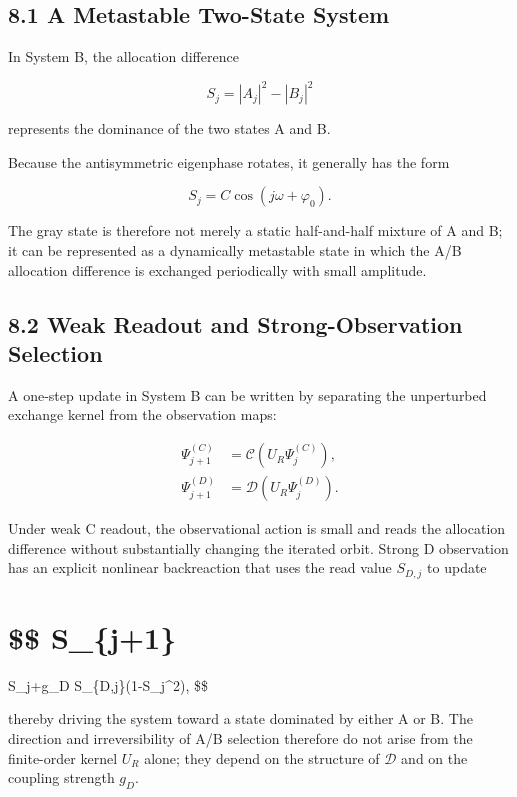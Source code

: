 \documentclass[
  a4paper,
  10pt]{article}
\begin{document}
\subsection{8.1 A Metastable Two-State
System}\label{81-a-metastable-two-state-system}

In System B, the allocation difference

\[
S_j=|A_j|^2-|B_j|^2
\]

represents the dominance of the two states A and B.

Because the antisymmetric eigenphase rotates, it generally has the form

\[
S_j=C\cos(j\omega+\varphi_0).
\]

The gray state is therefore not merely a static half-and-half mixture of
A and B; it can be represented as a dynamically metastable state in
which the A/B allocation difference is exchanged periodically with small
amplitude.

\subsection{8.2 Weak Readout and Strong-Observation
Selection}\label{82-weak-readout-and-strong-observation-selection}

A one-step update in System B can be written by separating the
unperturbed exchange kernel from the observation maps:

\[
\begin{aligned}
\Psi_{j+1}^{(C)}
&=\mathcal C\!\left(U_R\Psi_j^{(C)}\right),\\
\Psi_{j+1}^{(D)}
&=\mathcal D\!\left(U_R\Psi_j^{(D)}\right).
\end{aligned}
\]

Under weak C readout, the observational action is small and reads the
allocation difference without substantially changing the iterated orbit.
Strong D observation has an explicit nonlinear backreaction that uses
the read value \(S_{D,j}\) to update

\section{\$\$ S\_\{j+1\}}\label{-s_j1-1}

S\_j+g\_D S\_\{D,j\}(1-S\_j\^{}2), \$\$

thereby driving the system toward a state dominated by either A or B.
The direction and irreversibility of A/B selection therefore do not
arise from the finite-order kernel \(U_R\) alone; they depend on the
structure of \(\mathcal D\) and on the coupling strength \(g_D\).
\end{document}
